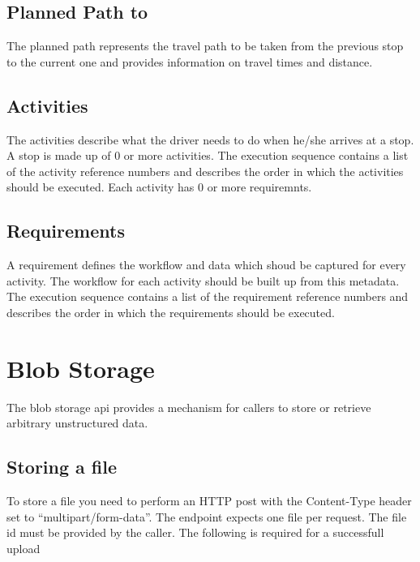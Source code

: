 \documentclass[letterpaper,10pt,english]{sphinxmanual}
\begin{document}
\subsection{Planned Path to}
\label{\detokenize{loads/drivers/loads/active-load:planned-path-to}}
The planned path represents the travel path to be taken from the previous stop to the current one and provides information on travel times and distance.


\subsection{Activities}
\label{\detokenize{loads/drivers/loads/active-load:activities}}
The activities describe what the driver needs to do when he/she arrives at a stop. A stop is made up of 0 or more activities. The execution sequence contains a list of the activity reference numbers and describes the order in which the activities should be executed. Each activity has 0 or more requiremnts.


\subsection{Requirements}
\label{\detokenize{loads/drivers/loads/active-load:requirements}}
A requirement defines the workflow and data which shoud be captured for every activity. The workflow for each activity should be built up from this metadata. The execution sequence contains a list of the requirement reference numbers and describes the order in which the requirements should be executed.


\section{Blob Storage}
\label{\detokenize{blob-storage/blob-storage:blob-storage}}\label{\detokenize{blob-storage/blob-storage::doc}}
The blob storage api provides a mechanism for callers to store or retrieve arbitrary unstructured data.


\subsection{Storing a file}
\label{\detokenize{blob-storage/blob-storage:storing-a-file}}
To store a file you need to perform an HTTP post with the Content-Type header set to ``multipart/form-data''. The endpoint expects one file per request. The file id must be provided by the caller. The following is required for a successfull upload
\end{document}
